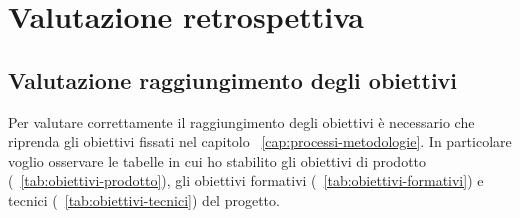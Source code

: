 
\pagebreak
\chapter{Valutazione retrospettiva}
\label{cap:analisi-requisiti}

\section{Valutazione raggiungimento degli obiettivi}

Per valutare correttamente il raggiungimento degli obiettivi è necessario che riprenda gli obiettivi fissati nel capitolo ~\ref{cap:processi-metodologie}.
In particolare voglio osservare le tabelle in cui ho stabilito gli obiettivi di prodotto (~\ref{tab:obiettivi-prodotto}), gli obiettivi formativi (~\ref{tab:obiettivi-formativi}) e tecnici (~\ref{tab:obiettivi-tecnici}) del progetto.

